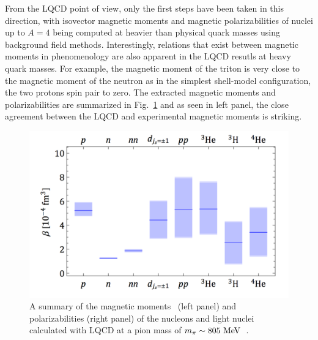 From the LQCD point of view, only the first steps have been taken in this direction, with isovector magnetic moments \cite{Beane:2014ora,Beane:2015yha,Detmold:2015daa} and magnetic  polarizabilities \cite{Chang:2015qxa} of nuclei up to $A=4$ being computed at heavier than physical quark masses using background field methods. Interestingly, relations that exist between magnetic moments in phenomenology are also apparent in the LQCD resutls at heavy quark masses. For example,  the magnetic moment of the triton is very close to the magnetic moment of the neutron as in the simplest shell-model configuration, the two protons spin pair to zero. The extracted magnetic moments and polarizabilities are summarized in Fig.~\ref{fig:summaryBETA} and as seen in left panel, the close agreement between the LQCD  and experimental magnetic moments is striking.
%
\begin{figure}[!t]
	\centering
	\includegraphics[width=0.49\columnwidth]{figures/PhysPols.pdf}
	\caption{ 
		A summary of the magnetic moments~\protect\cite{Beane:2014ora} (left panel) and polarizabilities (right panel) of the nucleons and
		light nuclei calculated with LQCD at a pion mass of
		$m_\pi\sim 805~{\rm MeV}$~\protect\cite{Chang:2015qxa}.    }
	\label{fig:summaryBETA}
\end{figure}

